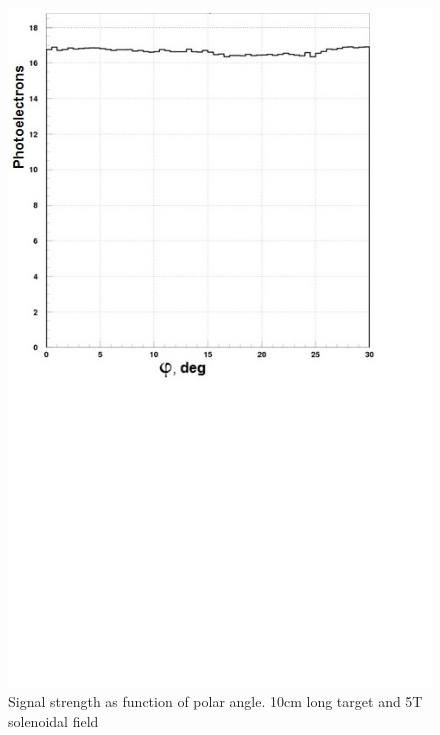 \begin{figure}[!ht]
    \centering
    \includegraphics[width=1.0\linewidth,trim={0.0cm 9.4cm 0.0cm 0.0cm},clip]{images/10cm_Targ_5T_Field_Phi.jpg}
    \caption{Signal strength as function of polar angle. 10cm long target and 5T solenoidal field}
    \label{fig:10cm_Targ_5T_Field_Phi}
\end{figure}

